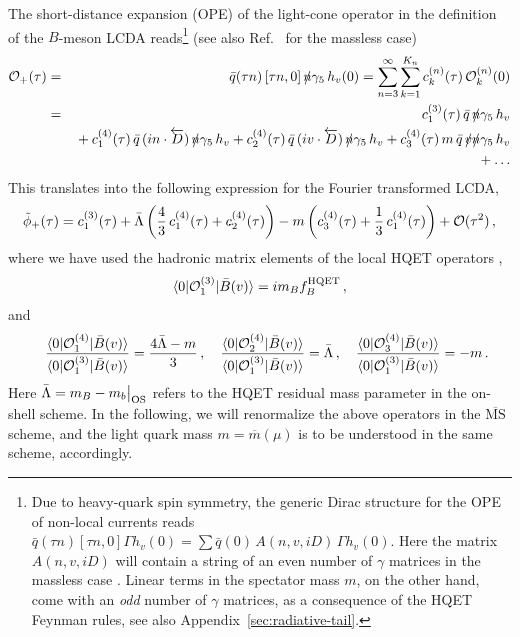 \documentclass[a4paper,11pt]{article}
\begin{document}
The short-distance expansion (OPE) of the light-cone operator in the definition of the $B$-meson LCDA reads\footnote{Due to heavy-quark spin symmetry, the generic Dirac structure for the OPE of non-local currents reads $\bar q(\tau n) [\tau n,0] \Gamma h_v(0) = \sum \bar q(0) \, A(n,v,iD) \, \Gamma h_v(0)$.
Here the matrix $A(n,v,iD)$ will contain a string of an even number of $\gamma$ matrices in the massless case \cite{Lee:2005gza}. Linear terms in the spectator mass $m$, on the other hand, come with an \emph{odd} number of $\gamma$ matrices, as a consequence of the HQET Feynman rules, see also Appendix~\ref{sec:radiative-tail}.
}
(see also Ref.~\cite{Kawamura:2008vq} for the massless case)
\begin{eqnarray}
{\cal O}_+(\tau) &=&	\bar q(\tau n) \left[\tau n,0\right] \slashed n\gamma_5 \, h_v(0) = \sum_{n=3}^\infty \sum_{k=1}^{K_n} c_k^{(n)}(\tau) \, {\cal O}_k^{(n)}(0)
	\cr &=& c_{1}^{(3)}(\tau) \, \bar q \, \slashed n\gamma_5 \, h_v  
	\cr && {} + c_{1}^{(4)}(\tau) \, \bar q \, (i n \cdot \overleftarrow{D}) \, \slashed n\gamma_5 \, h_v
	  + c_{2}^{(4)}(\tau) \, \bar q \, (i v \cdot \overleftarrow{D}) \, \slashed n \gamma_5 \, h_v 
	   + c_{3}^{(4)}(\tau) \, m \, \bar q \, \slashed v \slashed n \gamma_5 \, h_v 
    \cr && {} + \ldots
    \label{ope} 
\end{eqnarray}
This translates into the following expression for the Fourier transformed LCDA,
\begin{eqnarray}
	\tilde\phi_+(\tau) =
    c_1^{(3)}(\tau)
    + \bar \Lambda \left(
        \frac43 \, c_1^{(4)}(\tau)
        + c_2^{(4)}(\tau)
    \right)
	- m \left(
         c_3^{(4)}(\tau)
         + \frac13 \, c_1^{(4)}(\tau)
     \right)
     + {\cal O}(\tau^2) \,,
 \label{phiexp}
\end{eqnarray}
where we have used the hadronic matrix elements of the local HQET
operators \cite{Grozin:1996pq,Bell:2008er},
\begin{eqnarray}
	\langle 0| {\cal O}_1^{(3)} | \bar{B}(v)\rangle 
	= i  m_B f_B^{\rm HQET}  \,,
\end{eqnarray}
and
\begin{eqnarray}
&&	\frac{\langle 0| {\cal O}_1^{(4)} |\bar{B}(v)\rangle}{\langle 0| {\cal O}_1^{(3)} | \bar{B}(v)\rangle} = \frac{4\bar\Lambda - m}{3} \,, 
	\quad 
	\frac{\langle 0| {\cal O}_2^{(4)} |\bar{B}(v)\rangle}{\langle 0| {\cal O}_1^{(3)} | \bar{B}(v)\rangle} = \bar\Lambda \,,
	\quad
	\frac{\langle 0| {\cal O}_3^{(4)} |\bar{B}(v)\rangle}{\langle 0| {\cal O}_1^{(3)} | \bar{B}(v)\rangle} = - m \,.
\end{eqnarray} 
Here $\bar\Lambda=m_B - m_b\big|_{\rm OS}$ refers to the HQET residual mass parameter in the on-shell scheme. In the following, we will renormalize the above operators in the $\overline{\mathrm{MS}}$ scheme, and the light quark mass $m=\overline{m}(\mu)$ is to be understood in the same scheme, accordingly.
\end{document}

